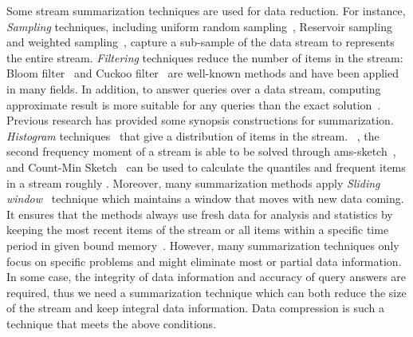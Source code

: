 Some stream summarization techniques are used for data reduction. For instance,
\emph{Sampling} techniques, including uniform random
sampling~\cite{vitter1984faster, Ahrens1985SequentialRS}, Reservoir
sampling~\cite{vitter1985random, Aggarwal2007DataS} and weighted
sampling~\cite{chaudhuri1999random, efraimidis2006weighted}, capture a
sub-sample of the data stream to represents the entire stream. \emph{Filtering}
techniques reduce the number of items in the stream: Bloom
filter~\cite{bloom1970space} and Cuckoo filter~\cite{fan2014cuckoo} are
well-known methods and have been applied in many fields.  In
addition, to  answer queries over a data stream, computing approximate result is
more suitable for any queries than the exact solution~\cite{kejariwal2015real}.
Previous research has provided some synopsis constructions for summarization.
\emph{Histogram} techniques~\cite{kejariwal2015real, ahmed2019data} that give a
distribution of items in the stream. ~\cite{flajolet1985probabilistic,
garofalakis2016data}, the second frequency moment of a stream is able to be solved
through \acrfull{ams-sketch}~\cite{alon1999space}, and Count-Min
Sketch~\cite{cormode2005improved, garofalakis2016data} can be used to calculate
the quantiles and frequent items in a stream roughly . Moreover, many summarization
methods apply \emph{Sliding window}~\cite{datar2002maintaining} technique
which maintains a window that moves with new data coming. It ensures that the
methods always use fresh data for analysis and statistics by keeping the most
recent items of the stream or all items within a specific time period in given bound
memory~\cite{leskovec2014mining}. However, many summarization techniques only
focus on specific problems and might eliminate most or partial data
information. In some case, the integrity of data information and accuracy of
query answers are required, thus we need a summarization technique which can
both reduce the size of the stream and keep integral data information. Data compression
is such a technique that meets the above conditions.


